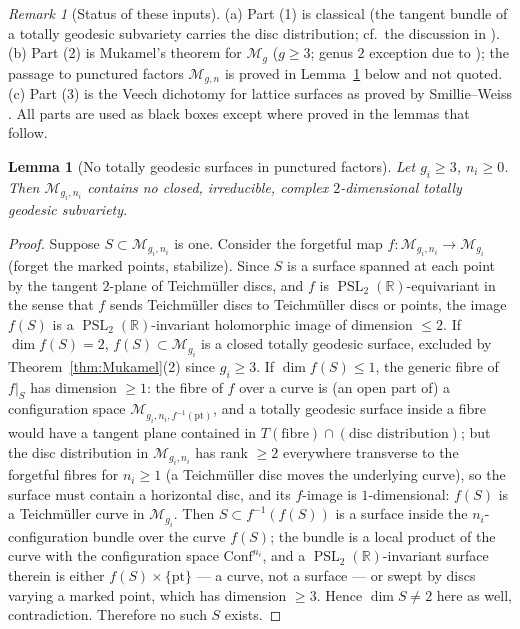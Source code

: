 \documentclass[11pt]{article}
\newcommand{\R}{\mathbb{R}}
\newcommand{\M}{\mathcal{M}}
\DeclareMathOperator{\PSL}{PSL}
\newtheorem{lem}[thm]{Lemma}
\theoremstyle{definition}
\theoremstyle{remark}
\newtheorem{rmk}[thm]{Remark}
\begin{document}
\begin{rmk}[Status of these inputs]\label{rmk:statusinputs}
(a) Part (1) is classical (the tangent bundle of a totally geodesic
subvariety carries the disc distribution; cf.\ the discussion in
\cite{Mukamel}). (b) Part (2) is Mukamel's theorem \cite{Mukamel} for
$\M_g$ ($g \ge 3$; genus $2$ exception due to \cite{McMullenHMS}); the
passage to punctured factors $\M_{g,n}$ is proved in
Lemma~\ref{lem:membership-exclusion} below and not quoted.
(c) Part (3) is the Veech dichotomy for lattice surfaces as proved by
Smillie--Weiss \cite{SW}. All parts are used as black boxes except
where proved in the lemmas that follow.
\end{rmk}

\begin{lem}[No totally geodesic surfaces in punctured
factors]\label{lem:membership-exclusion}
Let $g_i \ge 3$, $n_i \ge 0$. Then $\M_{g_i,n_i}$ contains no closed,
irreducible, complex $2$-dimensional totally geodesic subvariety.
\end{lem}

\begin{proof}
Suppose $S \subset \M_{g_i,n_i}$ is one. Consider the forgetful map
$f : \M_{g_i,n_i} \to \M_{g_i}$ (forget the marked points, stabilize).
Since $S$ is a surface spanned at each point by the tangent
$2$-plane of Teichm\"uller discs, and $f$ is $\PSL_2(\R)$-equivariant
in the sense that $f$ sends Teichm\"uller discs to Teichm\"uller discs
or points, the image $f(S)$ is a $\PSL_2(\R)$-invariant holomorphic
image of dimension $\le 2$. If $\dim f(S) = 2$, $f(S) \subset
\M_{g_i}$ is a closed totally geodesic surface, excluded by
Theorem~\ref{thm:Mukamel}(2) since $g_i \ge 3$.
If $\dim f(S) \le 1$, the generic fibre of $f|_S$ has dimension
$\ge 1$: the fibre of $f$ over a curve is (an open part of) a
configuration space $\M_{g_i,n_i,f^{-1}(\mathrm{pt})}$, and a
totally geodesic surface inside a fibre would have a tangent plane
contained in $T(\text{fibre}) \cap (\text{disc distribution})$; but
the disc distribution in $\M_{g_i,n_i}$ has rank $\ge 2$ everywhere
transverse to the forgetful fibres for $n_i \ge 1$ (a Teichm\"uller
disc moves the underlying curve), so the surface must contain a
horizontal disc, and its $f$-image is $1$-dimensional: $f(S)$ is a
Teichm\"uller curve in $\M_{g_i}$. Then $S \subset
f^{-1}(f(S))$ is a surface inside the $n_i$-configuration bundle over
the curve $f(S)$; the bundle is a local product of the curve with the
configuration space $\mathrm{Conf}^{n_i}$, and a $\PSL_2(\R)$-invariant
surface therein is either $f(S) \times \{\mathrm{pt}\}$ --- a curve, not
a surface --- or swept by discs varying a marked point, which has
dimension $\ge 3$. Hence $\dim S \neq 2$ here as well, contradiction.
Therefore no such $S$ exists.
\end{proof}
\end{document}
